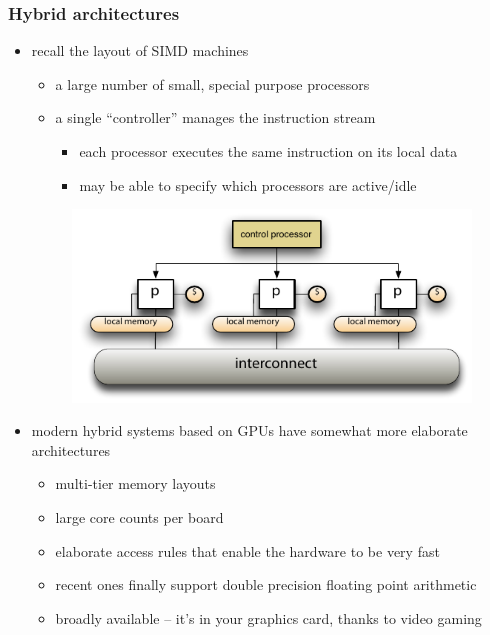 %
%
%
%


\begin{frame}[fragile]
%
  \frametitle{Hybrid architectures}
%
  \begin{itemize}
%
  \item recall the layout of SIMD machines
    \begin{itemize}
    \item a large number of small, special purpose processors
    \item a single ``controller'' manages the instruction stream
      \begin{itemize}
      \item each processor executes the same instruction on its local data
      \item may be able to specify which processors are active/idle
      \end{itemize}
    \end{itemize}
    \begin{figure}
      \centering
      \includegraphics[width=.50\linewidth]{figures/simd.pdf}
      \label{fig:simd}
    \end{figure}
%
  \item modern hybrid systems based on GPUs have somewhat more elaborate architectures
    \begin{itemize}
      \item multi-tier memory layouts
      \item large core counts per board
      \item elaborate access rules that enable the hardware to be very fast
      \item recent ones finally support double precision floating point arithmetic
      \item broadly available -- it's in your graphics card, thanks to video gaming
    \end{itemize}
%
  \end{itemize}
%
\end{frame}

